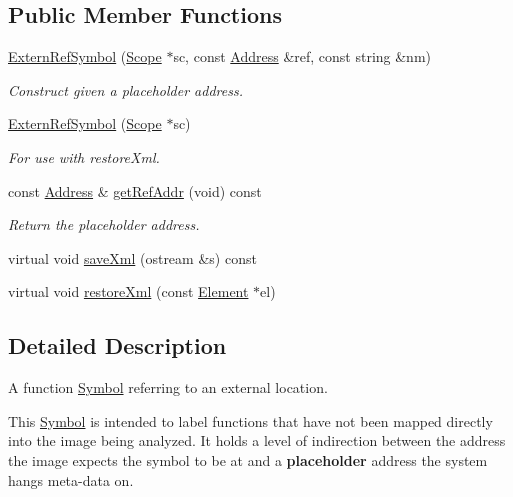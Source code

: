 \subsection*{Public Member Functions}
\begin{DoxyCompactItemize}
\item 
\mbox{\hyperlink{class_extern_ref_symbol_ac9c052df8c2ee617cdc3d1bd985121be}{Extern\+Ref\+Symbol}} (\mbox{\hyperlink{class_scope}{Scope}} $\ast$sc, const \mbox{\hyperlink{class_address}{Address}} \&ref, const string \&nm)
\begin{DoxyCompactList}\small\item\em Construct given a {\itshape placeholder} address. \end{DoxyCompactList}\item 
\mbox{\hyperlink{class_extern_ref_symbol_a49462aee64f40dd14c30962593f82648}{Extern\+Ref\+Symbol}} (\mbox{\hyperlink{class_scope}{Scope}} $\ast$sc)
\begin{DoxyCompactList}\small\item\em For use with restore\+Xml. \end{DoxyCompactList}\item 
const \mbox{\hyperlink{class_address}{Address}} \& \mbox{\hyperlink{class_extern_ref_symbol_a8bd2e8984b35871f657d88cee1464390}{get\+Ref\+Addr}} (void) const
\begin{DoxyCompactList}\small\item\em Return the {\itshape placeholder} address. \end{DoxyCompactList}\item 
virtual void \mbox{\hyperlink{class_extern_ref_symbol_aaff9d3efb4a2594f857799db35eddc1d}{save\+Xml}} (ostream \&s) const
\item 
virtual void \mbox{\hyperlink{class_extern_ref_symbol_a84cae4cba0ca0ec757c93c63cd55921e}{restore\+Xml}} (const \mbox{\hyperlink{class_element}{Element}} $\ast$el)
\end{DoxyCompactItemize}


\subsection{Detailed Description}
A function \mbox{\hyperlink{class_symbol}{Symbol}} referring to an external location. 

This \mbox{\hyperlink{class_symbol}{Symbol}} is intended to label functions that have not been mapped directly into the image being analyzed. It holds a level of indirection between the address the image expects the symbol to be at and a {\bfseries{placeholder}} address the system hangs meta-\/data on. 

